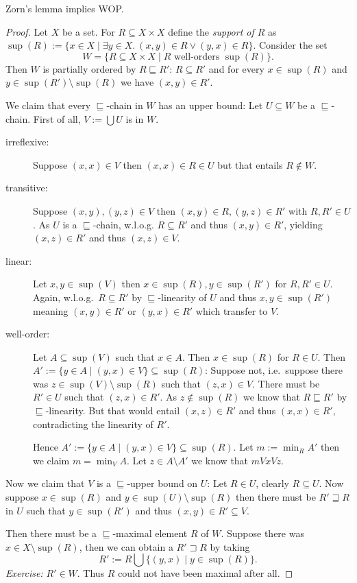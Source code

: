 \documentclass{whrartcl}
\begin{document}
\begin{theorem}
  Zorn's lemma implies WOP.
\end{theorem}
\begin{proof}
  Let $X$ be a set. For $R \subseteq X \times X$ define the \emph{support of
    $R$} as $\sup(R) := \{x \in X \mid \exists y \in X.~(x, y) \in R \vee (y, x)
  \in R\}$. Consider the set
  \[
    W = \{R \subseteq X \times X \mid R \text{ well-orders } \sup(R)\}.
  \]
  Then $W$ is partially ordered by $R \sqsubseteq R'$: $R \subseteq R'$ and for
  every $x \in \sup(R)$ and $y \in \sup(R') \setminus \sup(R)$ we have $(x, y)
  \in R'$.

  We claim that every $\sqsubseteq$-chain in $W$ has an upper bound: Let $U \subseteq W$ be
  a $\sqsubseteq$-chain. First of all, $V := \bigcup U$ is in $W$.
  \begin{description}
  \item[irreflexive:] Suppose $(x, x) \in V$ then $(x, x) \in R \in U$
    but that entails $R \not\in W$.
  \item[transitive:] Suppose $(x, y), (y, z) \in V$ then $(x, y) \in R,
    (y, z) \in R'$ with $R, R' \in U$. As $U$ is a $\sqsubseteq$-chain, w.l.o.g. $R \subseteq
    R'$ and thus $(x, y) \in R'$, yielding $(x, z) \in R'$ and thus $(x, z) \in
    V$.
  \item[linear:] Let $x, y \in \sup(V)$ then $x \in \sup(R), y \in
    \sup(R')$ for $R, R' \in U$. Again, w.l.o.g.\ $R \subseteq R'$ by
    $\sqsubseteq$-linearity of $U$ and thus $x, y \in \sup(R')$ meaning $(x, y) \in
    R'$ or $(y, x) \in R'$ which transfer to $V$.
  \item[well-order:] Let $A \subseteq \sup(V)$ such that $x \in A$. Then
    $x \in \sup(R)$ for $R \in U$. Then $A' := \{y \in A \mid (y, x) \in V \} \subseteq
    \sup(R)$: Suppose not, i.e.\ suppose there was $z \in \sup(V) \setminus \sup(R)$ such that
    $(z, x) \in V$. There must be $R' \in U$ such that $(z, x) \in R'$. As $z
    \not\in \sup(R)$ we know that $R \sqsubseteq R'$ by $\sqsubseteq$-linearity.
    But that would entail $(x, z) \in R'$ and thus $(x, x) \in R'$,
    contradicting the linearity of $R'$.

    Hence $A' := \{y \in A \mid (y, x) \in V\} \subseteq \sup(R)$. Let $m :=
    \min_R A'$ then we claim $m = \min_V A$. Let $z \in A \setminus A'$ we know
    that $m V x V z$.
  \end{description}
  Now we claim that $V$ is a $\sqsubseteq$-upper bound on $U$: Let $R \in U$,
  clearly $R \subseteq U$. Now suppose $x \in \sup(R)$ and $y \in \sup(U)
  \setminus \sup(R)$ then there must be $R' \sqsupseteq R$ in $U$ such that $y
  \in \sup(R')$ and thus $(x, y) \in R' \subseteq V$.

  Then there must be a $\sqsubseteq$-maximal element $R$ of $W$. Suppose there
  was $x \in X \setminus \sup(R)$, then we can obtain a $R' \sqsupset R$ by taking
  \[R' := R \bigcup \{(y, x) \mid y \in \sup(R)\}.\]
  \emph{Exercise:} $R' \in W$. Thus $R$ could not have been maximal after all.
\end{proof}
\end{document}
